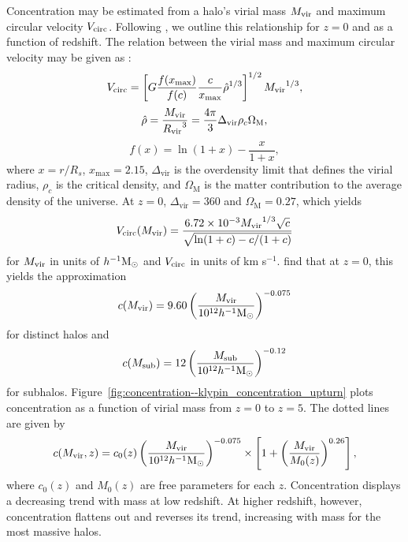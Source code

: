 Concentration may be estimated from a halo's virial mass ${M_{\mathrm{vir}}}$ and maximum circular velocity ${V_{\mathrm{circ}}}$.  Following \citet{2011ApJ...740..102K}, we outline this relationship for $z = 0$ and as a function of redshift.  The relation between the virial mass and maximum circular velocity may be given as \citep{2001ApJ...554..903K}:
\begin{equation}
	{V_{\mathrm{circ}}} = \left[ G \frac{f(x_{\max})}{f(c)} \frac{c}{x_{\max}} \hat{\rho}^{1/3} \right]^{1/2} {M_{\mathrm{vir}}}^{1/3},
\end{equation}
\begin{equation}
	\hat{\rho} = \frac{{M_{\mathrm{vir}}}}{{R_{\mathrm{vir}}}^{3}} = \frac{4 \pi}{3} \Delta_{\mathrm{vir}} \rho_{c} \Omega_{\mathrm{M}},
\end{equation}
\begin{equation}
	f(x) = \ln(1 + x) - \frac{x}{1 + x},
\end{equation}
where $x = r / R_{s}$, $x_{\max} = 2.15$, $\Delta_{\mathrm{vir}}$ is the overdensity limit that defines the virial radius, $\rho_{c}$ is the critical density, and $\Omega_{\mathrm{M}}$ is the matter contribution to the average density of the universe.  At $z = 0$, $\Delta_{\mathrm{vir}} = 360$ and $\Omega_{\mathrm{M}} = 0.27$, which yields
\begin{equation}
	{V_{\mathrm{circ}}}({M_{\mathrm{vir}}}) = \frac{6.72 \times 10^{-3} {M_{\mathrm{vir}}}^{1/3} \sqrt{c}}{\sqrt{\ln(1 + c) - c / (1 + c)}}
\end{equation}
for ${M_{\mathrm{vir}}}$ in units of $h^{-1} {\rm M_\odot}$ and ${V_{\mathrm{circ}}}$ in units of km s$^{-1}$.  \citet{2011ApJ...740..102K} find that at $z = 0$, this yields the approximation
\begin{equation}
	c({M_{\mathrm{vir}}}) = 9.60 \left( \frac{{M_{\mathrm{vir}}}}{10^{12} h^{-1} {\rm M_\odot}} \right)^{-0.075}
\end{equation}
for distinct halos and
\begin{equation}
	c(M_{\mathrm{sub}}) = 12 \left( \frac{M_{\mathrm{sub}}}{10^{12} h^{-1} {\rm M_\odot}} \right)^{-0.12}
\end{equation}
for subhalos.  Figure~\ref{fig:concentration--klypin_concentration_upturn} plots concentration as a function of virial mass from $z = 0$ to $z = 5$.  The dotted lines are given by
\begin{equation} \label{eq:concentration_mass_upturn}
	c({M_{\mathrm{vir}}},z) = c_{0}(z) \left( \frac{{M_{\mathrm{vir}}}}{10^{12} h^{-1} {\rm M_\odot}} \right)^{-0.075} \times \left[ 1 + \left( \frac{{M_{\mathrm{vir}}}}{M_{0}(z)} \right)^{0.26} \right],
\end{equation}
where $c_{0}(z)$ and $M_{0}(z)$ are free parameters for each $z$.  Concentration displays a decreasing trend with mass at low redshift.  At higher redshift, however, concentration flattens out and reverses its trend, increasing with mass for the most massive halos.

